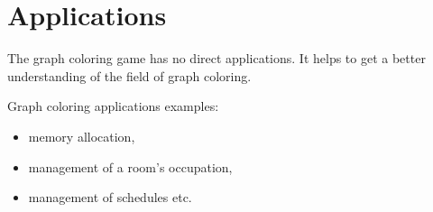 \section{Applications}

The graph coloring game has no direct applications. It helps to get a better understanding of the field of graph coloring.

Graph coloring applications examples:
\begin{itemize}
\item memory allocation,
\item management of a room's occupation, 
\item management of schedules etc.
\end{itemize}



